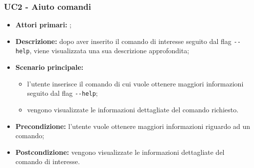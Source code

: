 \subsubsection{UC2 - Aiuto comandi}
\begin{itemize}
	\item \textbf{Attori primari:} \ug{};
	\item \textbf{Descrizione:} dopo aver inserito il comando di interesse seguito dal flag \texttt{-{}-help}, viene visualizzata una sua descrizione approfondita;  
	\item \textbf{Scenario principale:} 
	\begin{itemize}
		\item l’utente inserisce il comando di cui vuole ottenere maggiori informazioni seguito dal flag \texttt{-{}-help};
		\item vengono visualizzate le informazioni dettagliate del comando richiesto. 
	\end{itemize}
	\item \textbf{Precondizione:} l’utente vuole ottenere maggiori informazioni riguardo ad un comando;
	\item \textbf{Postcondizione:} vengono visualizzate le informazioni dettagliate del comando di interesse.  
\end{itemize}